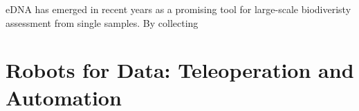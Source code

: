 eDNA has emerged in recent years as a promising tool for large-scale biodiveristy assessment from single samples. By collecting 




\section{Robots for Data: Teleoperation and Automation}



